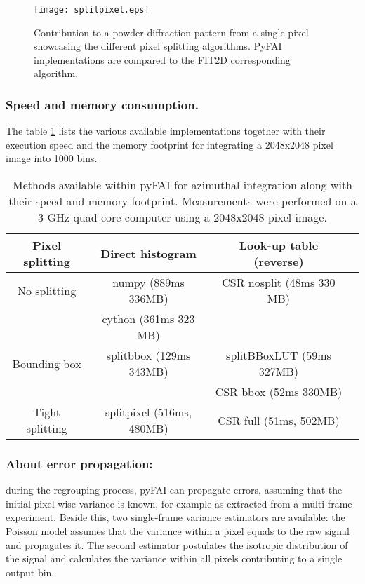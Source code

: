 \documentclass{iucr}
\begin{document}
\begin{figure}
\label{split}
\begin{center}
\texttt{[image: splitpixel.eps]}
\caption{Contribution to a powder diffraction pattern from a single pixel
showcasing the different pixel splitting algorithms. PyFAI implementations are
compared to the FIT2D corresponding algorithm.}
\end{center}
\end{figure}

\subsubsection{Speed and memory consumption.}

The table \ref{table_methods}  lists the various available implementations
together with their execution speed and the memory footprint for integrating a 2048x2048
pixel image into 1000 bins.

\begin{table}
\label{table_methods}
\caption{Methods available within pyFAI for azimuthal integration
along with their speed and memory footprint. 
Measurements were performed on a 3 GHz quad-core
computer using a 2048x2048 pixel image.}
\begin{tabular}[pos]{c|c|c|c}
Pixel splitting			& Direct histogram 		& Look-up table (reverse) \\
\hline
No splitting          & numpy (889ms 336MB)  &CSR nosplit (48ms 330 MB)\\ 
					  & cython (361ms 323 MB) & \\
\hline
Bounding box          & splitbbox (129ms 343MB) & splitBBoxLUT (59ms 327MB)\\
					&						&	CSR bbox (52ms 330MB) \\
\hline
Tight splitting & splitpixel (516ms, 480MB) &CSR full (51ms, 502MB)\\
\end{tabular}
\end{table}


\subsubsection{About error propagation:}
during the regrouping process, pyFAI can propagate errors, assuming that the
initial pixel-wise variance is known, for example as extracted from a
multi-frame experiment. Beside this, two single-frame variance estimators are
available: the Poisson model assumes that the variance within a pixel equals to
the raw signal and propagates it. The second estimator postulates the
isotropic distribution of the signal and calculates the variance within all
pixels contributing to a single output bin. 
\end{document}
